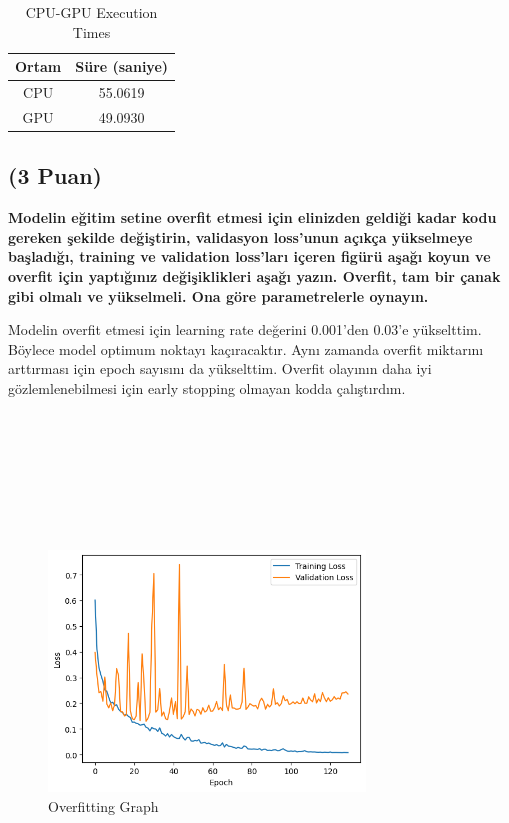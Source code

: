 \documentclass[11pt]{article}
\begin{document}
\begin{table}[ht!]
    \centering
    \caption{CPU-GPU Execution Times}
    \begin{tabular}{c|c}
        Ortam & Süre (saniye) \\\hline
        CPU & 55.0619 \\
        GPU & 49.0930\\
    \end{tabular}
    \label{tab:my_table}
\end{table}

\subsection{(3 Puan)} \textbf{Modelin eğitim setine overfit etmesi için elinizden geldiği kadar kodu gereken şekilde değiştirin, validasyon loss'unun açıkça yükselmeye başladığı, training ve validation loss'ları içeren figürü aşağı koyun ve overfit için yaptığınız değişiklikleri aşağı yazın. Overfit, tam bir çanak gibi olmalı ve yükselmeli. Ona göre parametrelerle oynayın.}

Modelin overfit etmesi için learning rate değerini 0.001'den 0.03'e yükselttim. Böylece model optimum noktayı kaçıracaktır. Aynı zamanda overfit miktarını arttırması için epoch sayısını da yükselttim. Overfit olayının daha iyi gözlemlenebilmesi için early stopping olmayan kodda çalıştırdım.
\\
\\
\\
\\
\\
\\
\\
\\

\begin{figure}[ht!]
    \centering
    \includegraphics[width=0.75\textwidth]{overfitting.png}
    \caption{Overfitting Graph}
    \label{fig:my_pic}
\end{figure}
\end{document}
